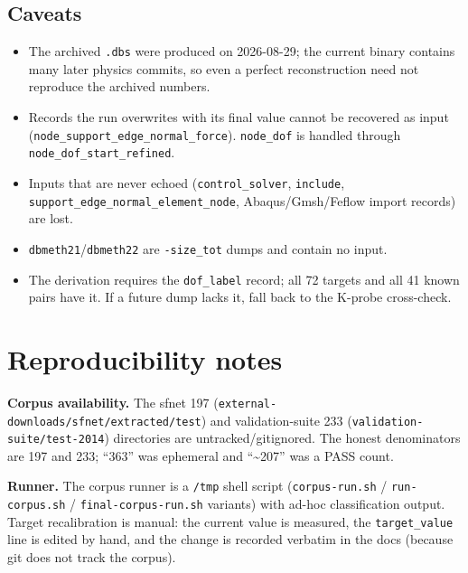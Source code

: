 \documentclass[11pt,a4paper]{report}
\newcommand{\code}[1]{\texttt{#1}}
\begin{document}
\section*{Caveats}

\begin{itemize}
  \item The archived \code{.dbs} were produced on 2026-08-29; the current binary
        contains many later physics commits, so even a perfect reconstruction
        need not reproduce the archived numbers.
  \item Records the run overwrites with its final value cannot be recovered as
        input (\code{node\_\allowbreak support\_\allowbreak edge\_\allowbreak normal\_\allowbreak force}). \code{node\_\allowbreak dof} is handled
        through \code{node\_\allowbreak dof\_\allowbreak start\_\allowbreak refined}.
  \item Inputs that are never echoed (\code{control\_\allowbreak solver}, \code{include},
        \code{support\_\allowbreak edge\_\allowbreak normal\_\allowbreak element\_\allowbreak node}, Abaqus/Gmsh/Feflow import
        records) are lost.
  \item \code{dbmeth21}/\code{dbmeth22} are \code{-size\_\allowbreak tot} dumps and contain no
        input.
  \item The derivation requires the \code{dof\_\allowbreak label} record; all 72 targets and
        all 41 known pairs have it. If a future dump lacks it, fall back to the
        K-probe cross-check.
\end{itemize}

\chapter{Reproducibility notes}
\label{app:repro}

\textbf{Corpus availability.} The sfnet 197
(\code{external-downloads/\allowbreak sfnet/\allowbreak extracted/\allowbreak test}) and validation-suite 233
(\code{validation-suite/\allowbreak test-2014}) directories are untracked/gitignored. The
honest denominators are 197 and 233; ``363'' was ephemeral and ``\textasciitilde207''
was a PASS count.

\textbf{Runner.} The corpus runner is a \code{/\allowbreak tmp} shell script
(\code{corpus-run.sh} / \code{run-corpus.sh} / \code{final-corpus-run.sh}
variants) with ad-hoc classification output. Target recalibration is manual: the
current value is measured, the \code{target\_\allowbreak value} line is edited by hand, and
the change is recorded verbatim in the docs (because git does not track the
corpus).
\end{document}
